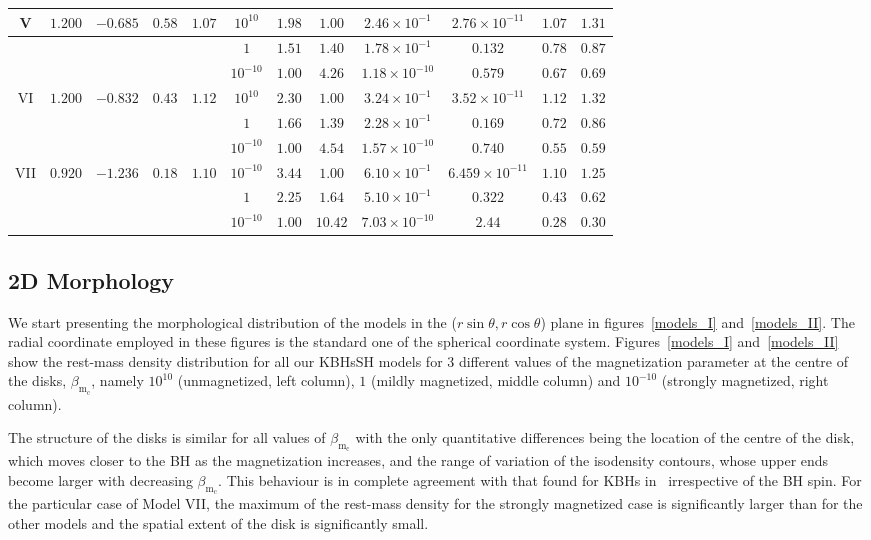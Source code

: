 \documentclass[twocolumn,aps,showpacs,showkeys,prd,superscriptaddress,byrevtex, amsmath]{revtex4-1}
\begin{document}
\begin{table}[t]
\begin{tabular}{c c c c c  c c c c c c c}
\hline   
V & $1.200$ & $-0.685$ & $0.58$ & $1.07$ & $10^{10}$ & $1.98$ & $1.00$ & $2.46 \times 10^{-1}$ & $2.76 \times 10^{-11}$ & $1.07$ & $1.31$\\ 
\hline 
 &  &  &  &  & $1$ & $1.51$ & $1.40$ & $1.78 \times 10^{-1}$ & $0.132$ & $0.78$ & $0.87$ \\ 
\hline 
 &  &  &  &  & $10^{-10}$ & $1.00$ & $4.26$ & $1.18 \times 10^{-10}$ & $0.579$ & $0.67$ & $0.69$ \\ 
\hline   
VI & $1.200$ & $-0.832$ & $0.43$ & $1.12$ & $10^{10}$ & $2.30$ & $1.00$ & $3.24 \times 10^{-1}$ & $3.52 \times 10^{-11}$ & $1.12$ & $1.32$ \\ 
\hline 
 &  &  &  &  & $1$ & $1.66$ & $1.39$ & $2.28 \times 10^{-1}$ & $0.169$ & $0.72$ & $0.86$ \\ 
\hline 
 &  &  &  &  & $10^{-10}$ & $1.00$ & $4.54$ & $1.57 \times 10^{-10}$ & $0.740$ & $0.55$ & $0.59$ \\ 
\hline 
VII & $0.920$ & $-1.236$ & $0.18$ & $1.10$ & $10^{-10}$ & $3.44$ & $1.00$ & $6.10 \times 10^{-1}$ & $6.459 \times 10^{-11}$ & $1.10$ & $1.25$ \\ 
\hline 
 &  &  &  &  & $1$ & $2.25$ & $1.64$ & $5.10 \times 10^{-1}$ & $0.322$ & $0.43$ & $0.62$\\ 
\hline 
 &  &  &  &  & $10^{-10}$ & $1.00$ & $10.42$ & $7.03 \times 10^{-10}$ & $2.44$ & $0.28$ & $0.30$\\ 
\hline 
\end{tabular}
\end{table}

\subsection{2D Morphology}

We start presenting the morphological distribution of the models in the ($r\sin\theta, r\cos\theta$) plane in figures~\ref{models_I} and~\ref{models_II}. The radial coordinate employed in these figures is the standard one of the spherical coordinate system. Figures~\ref{models_I} and~\ref{models_II} show the rest-mass density distribution for all our KBHsSH models for 3 different values of the magnetization parameter at the centre of the disks, $\beta_{\mathrm{m_c}}$, namely $10^{10}$ (unmagnetized, left column), $1$ (mildly magnetized, middle column) and $10^{-10}$ (strongly magnetized, right column). 

The structure of the disks is similar for all values of $\beta_{\mathrm{m_c}}$ with the only quantitative differences being the location of the centre of the disk, which moves closer to the BH as the magnetization increases, and the range of variation of the isodensity contours, whose upper ends become larger with decreasing $\beta_{\mathrm{m_c}}$. This behaviour is in complete agreement with that found for KBHs in~\cite{Gimeno-Soler:2017} irrespective of the BH spin. For the particular case of Model VII, the maximum of the rest-mass density for the strongly magnetized case is significantly larger than for the other models and the spatial extent of the disk is significantly small. 
\end{document}
